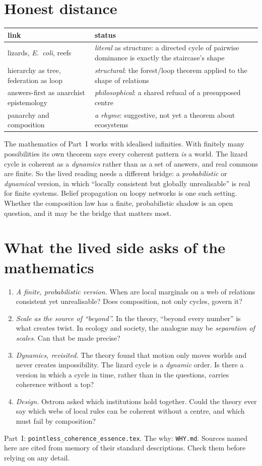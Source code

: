 \documentclass[11pt]{article}
\begin{document}
\section{Honest distance}
\begin{center}\small
\begin{tabular}{|>{\raggedright\arraybackslash}p{4.2cm}|>{\raggedright\arraybackslash}p{9.2cm}|}
\hline
\textbf{link} & \textbf{status}\\\hline
lizards, \emph{E.\ coli}, reefs & \emph{literal} as structure: a directed cycle of pairwise dominance is exactly the staircase's shape\\\hline
hierarchy as tree, federation as loop & \emph{structural}: the forest/loop theorem applied to the shape of relations\\\hline
answers-first as anarchist epistemology & \emph{philosophical}: a shared refusal of a presupposed centre\\\hline
panarchy and composition & \emph{a rhyme}: suggestive, not yet a theorem about ecosystems\\\hline
\end{tabular}
\end{center}
The mathematics of Part~I works with idealised infinities. With finitely many
possibilities its own theorem says every coherent pattern \emph{is} a world. The
lizard cycle is coherent as a \emph{dynamics} rather than as a set of answers, and
real commons are finite. So the lived reading needs a different bridge: a
\emph{probabilistic} or \emph{dynamical} version, in which ``locally consistent
but globally unrealisable'' is real for finite systems. Belief propagation on
loopy networks is one such setting. Whether the composition law has a finite,
probabilistic shadow is an open question, and it may be the bridge that matters
most.

\section{What the lived side asks of the mathematics}
\begin{enumerate}[nosep]
  \item \emph{A finite, probabilistic version.} When are local marginals on a
    web of relations consistent yet unrealisable? Does composition, not only
    cycles, govern it?
  \item \emph{Scale as the source of ``beyond''.} In the theory, ``beyond every
    number'' is what creates twist. In ecology and society, the analogue may be
    \emph{separation of scales}. Can that be made precise?
  \item \emph{Dynamics, revisited.} The theory found that motion only moves
    worlds and never creates impossibility. The lizard cycle is a \emph{dynamic}
    order. Is there a version in which a cycle in time, rather than in the
    questions, carries coherence without a top?
  \item \emph{Design.} Ostrom asked which institutions hold together. Could the
    theory ever say which webs of local rules can be coherent without a centre,
    and which must fail by composition?
\end{enumerate}

\bigskip
\noindent\small
Part~I: \texttt{pointless\_coherence\_essence.tex}. The why:
\texttt{WHY.md}. Sources named here are cited from memory of their standard
descriptions. Check them before relying on any detail.
\end{document}

